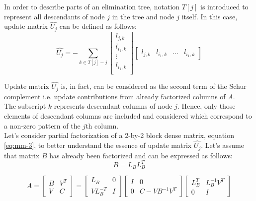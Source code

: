 In order to describe parts of an elimination tree, notation $T[j]$ is introduced to represent all descendants of node $j$ in the tree and node $j$ itself. In this case, update matrix $\hat{U_{j}}$ can be defined as follows:\\

\begin{equation} \label{eq:mm-2}
	\hat{U_{j}} = - \sum_{k \in T[j] -{j}}  \begin{bmatrix}
l_{j,k} \\
l_{i_1,k} \\
\vdots \\
l_{i_1,k} \\
\end{bmatrix} \begin{bmatrix}
l_{j,k} & l_{i_1,k} & \dots & l_{i_1,k}
\end{bmatrix} 
\end{equation}


Update matrix $\hat{U_{j}}$ is, in fact, can be considered as the second term of the Schur complement i.e. update contributions from already factorized columns of $A$.\\

The subscript $k$ represents descendant columns of node $j$. Hence, only those elements of descendant columns are included and considered which correspond to a non-zero pattern of the $j$th column.\\

Let's consider partial factorization of a 2-by-2 block dense matrix, equation \ref{eq:mm-3}, to better understand the essence of update matrix $\hat{U_{j}}$. Let's assume that  matrix $B$ has already been factorized and can be expressed as follows: \\


\begin{equation} \label{eq:mm-4}
	B = L_{B}L^{T}_{B}
\end{equation}


\begin{equation} \label{eq:mm-3}
A = \begin{bmatrix}
B & V^{T} \\
V & C
\end{bmatrix} 
= 
\begin{bmatrix}
L_{B} & 0 \\
VL^{-T}_{B} & I
\end{bmatrix}
\begin{bmatrix}
I & 0 \\
0 & C - VB^{-1}V^{T}
\end{bmatrix} 
\begin{bmatrix}
L^{T}_{B} & L^{-1}_{B}V^{T} \\
0 & I
\end{bmatrix} 
\end{equation}


